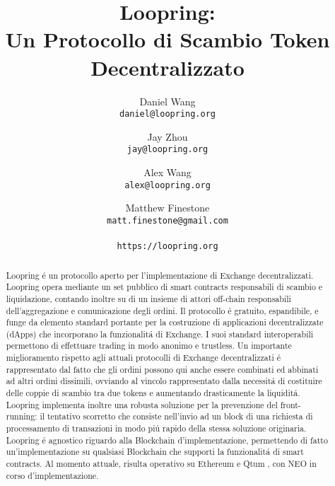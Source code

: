 \documentclass[UTF8,nofonts]{article}
\title{\textbf{Loopring:}\\\textbf{Un Protocollo di Scambio Token Decentralizzato}}
\author{
  Daniel Wang\\
  \texttt{daniel@loopring.org}\\
  \and
  	Jay Zhou\\
  	\texttt{jay@loopring.org}\\
  	\and
  	Alex Wang\\
  	\texttt{alex@loopring.org}\\
  	\and
  	Matthew Finestone\\
  	\texttt{matt.finestone@gmail.com}\\
  \\
  \texttt{https://loopring.org}
 }
\begin{document}
\maketitle


\begin{abstract}
Loopring \'e un protocollo aperto per l'implementazione di Exchange decentralizzati. Loopring opera mediante un set pubblico di smart contracts responsabili di scambio e liquidazione, contando inoltre su di un insieme di attori off-chain responsabili dell'aggregazione e comunicazione degli ordini. Il protocollo \'e gratuito, espandibile, e funge da elemento standard portante per la costruzione di applicazioni decentralizzate (dApps) che incorporano la funzionalit\'a di Exchange. I suoi standard interoperabili permettono di effettuare trading in modo anonimo e trustless. Un importante miglioramento rispetto agli attuali protocolli di Exchange decentralizzati \'e rappresentato dal fatto che gli ordini possono qui anche essere combinati ed abbinati ad altri ordini dissimili, ovviando al vincolo rappresentato dalla necessit\'a di costituire delle coppie di scambio tra due tokens e aumentando drasticamente la liquidit\'a. Loopring implementa inoltre una robusta soluzione per la prevenzione del front-running: il tentativo scorretto che consiste nell'invio ad un block di una richiesta di processamento di transazioni in modo pi\'u rapido della stessa soluzione originaria. Loopring \'e agnostico riguardo alla Blockchain d'implementazione, permettendo di fatto un'implementazione su qualsiasi Blockchain che supporti la funzionalit\'a di smart contracts. Al momento attuale, risulta operativo su Ethereum \cite{buterin2017ethereum} \cite{wood2014ethereum} e Qtum \cite{dai2017smart}, con NEO \cite{atterlonn2018distributed} in corso d'implementazione.

\end{abstract}
\end{document}

